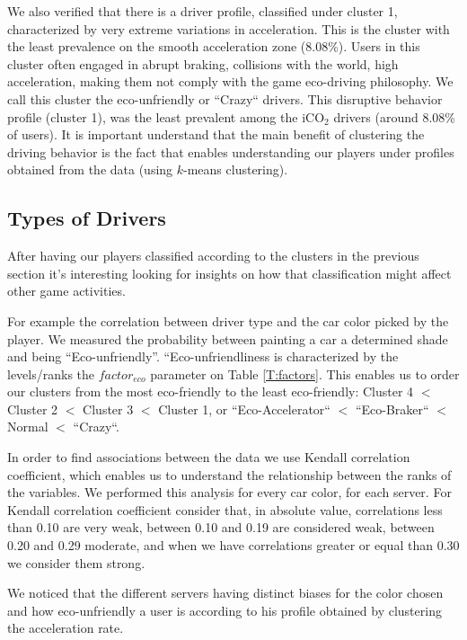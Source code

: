\documentclass[preprint,authoryear,12pt]{elsarticle}
\begin{document}
We also verified that there is a driver profile, classified under cluster 1, characterized by very extreme variations in acceleration. This is the cluster with the least prevalence on the smooth acceleration zone (8.08\%). Users in this cluster often engaged in abrupt braking, collisions with the world, high acceleration, making them not comply with the game eco-driving philosophy. We call this cluster the eco-unfriendly or ``Crazy`` drivers. 
This disruptive behavior profile (cluster 1), was the least prevalent among the iCO$_2$ drivers (around 8.08\% of users).
It is important understand that the main benefit of clustering the driving behavior is the fact that enables understanding our players under profiles obtained from the data (using $k$-means clustering).


\subsection{Types of Drivers}

After having our players classified according to the clusters in the previous section it's interesting  looking for insights on how that classification might affect other game activities.


For example the correlation between driver type and the car color picked by the player. We measured the probability between painting a car a determined shade and being “Eco-unfriendly”.
“Eco-unfriendliness is characterized by the levels/ranks the $factor_{eco}$ parameter on Table \ref{T:factors}. This enables us to order our clusters from the most eco-friendly to the least eco-friendly: Cluster 4 $<$ Cluster 2 $<$ Cluster 3 $<$ Cluster 1, or ``Eco-Accelerator``  $<$ ``Eco-Braker`` $<$  Normal $<$ ``Crazy``. 


In order to find associations between the data we use Kendall correlation coefficient, which enables us to understand the relationship between the ranks of the variables. We performed this analysis for every car color, for each server.
For Kendall correlation coefficient consider that, in absolute value, correlations less than 0.10 are very weak, between 0.10 and 0.19 are considered weak, between 0.20 and 0.29 moderate, and when we have correlations greater or equal than 0.30 we consider them strong.

We noticed that the different servers having distinct biases for the color chosen and how eco-unfriendly a user is according to his profile obtained by clustering the acceleration rate.   
\end{document}
